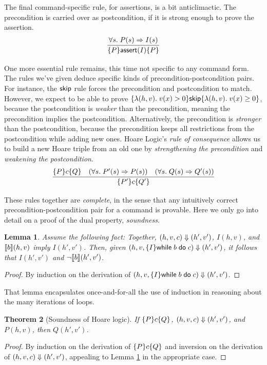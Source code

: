 \documentclass{amsbook}
\newtheorem{theorem}{Theorem}[chapter]
\newtheorem{lemma}[theorem]{Lemma}
\theoremstyle{definition}
\theoremstyle{remark}
\numberwithin{section}{chapter}
\numberwithin{equation}{chapter}
\begin{document}
The final command-specific rule, for assertions, is a bit anticlimactic.
The precondition is carried over as postcondition, if it is strong enough to prove the assertion.
$$\infer{\hoare{P}{\assert{I}}{P}}{
  \forall s. \; P(s) \Rightarrow I(s)
}$$

One more essential rule remains, this time not specific to any command form.
The rules we've given deduce specific kinds of precondition-postcondition pairs.
For instance, the $\mathsf{skip}$ rule forces the precondition and postcondition to match.
However, we expect to be able to prove $\{\lambda (h, v). \; v(x) > 0\} \mathsf{skip} \{\lambda (h, v). \; v(x) \geq 0\}$, because the postcondition is \emph{weaker} than the precondition, meaning the precondition implies the postcondition.
Alternatively, the precondition is \emph{stronger} than the postcondition, because the precondition keeps all restrictions from the postcondition while adding new ones.
Hoare Logic's \emph{rule of consequence} allows us to build a new Hoare triple from an old one by \emph{strengthening the precondition} and \emph{weakening the postcondition}.
$$\infer{\hoare{P'}{c}{Q'}}{
  \hoare{P}{c}{Q}
  & (\forall s. \; P'(s) \Rightarrow P(s))
  & (\forall s. \; Q(s) \Rightarrow Q'(s))
}$$

These rules together are \emph{complete}, in the sense that any intuitively correct precondition-postcondition pair for a command is provable.
Here we only go into detail on a proof of the dual property, \emph{soundness}.

\begin{lemma}\label{hoare_while}
  Assume the following fact: Together, $(h, v, c) \Downarrow (h', v')$, $I(h, v)$, and ${\left \llbracket b \right \rrbracket}(h, v)$ imply $I(h', v')$.
  Then, given $(h, v, \{I\} \mathsf{while} \; b \; \mathsf{do} \; c) \Downarrow (h', v')$, it follows that $I(h', v')$ and $\neg {\left \llbracket b \right \rrbracket}(h', v')$.
\end{lemma}
\begin{proof}
  By induction on the derivation of $(h, v, \{I\} \mathsf{while} \; b \; \mathsf{do} \; c) \Downarrow (h', v')$.
\end{proof}

That lemma encapsulates once-and-for-all the use of induction in reasoning about the many iterations of loops.

\begin{theorem}[Soundness of Hoare logic]
  If $\{P\} c \{Q\}$, $(h, v, c) \Downarrow (h', v')$, and $P(h, v)$, then $Q(h', v')$.
\end{theorem}
\begin{proof}
  By induction on the derivation of $\{P\} c \{Q\}$ and inversion on the derivation of $(h, v, c) \Downarrow (h', v')$, appealing to Lemma \ref{hoare_while} in the appropriate case.
\end{proof}
\end{document}
